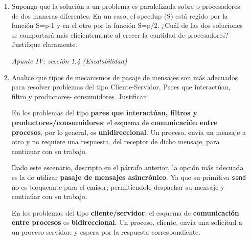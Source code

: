 \documentclass[a4paper, 10pt]{article}
\newenvironment{QandA}{
    \begin{enumerate}\bfseries}
    {\end{enumerate}
}
\newenvironment{answered}{\par\normalfont}{}
\begin{document}
\begin{QandA}
\begin{lstlisting}[multicols=2]
int request[n] = ([n] 0),
    grant[n] = ([n] 0);

Process Worker[i = 1..n]
    
# Seccion no critica ...

request[i] = 1;
while(grant[i] == 0) skip;
# Seccion Critica
grant[i] = 0;
# Seccion no critica ...
end;

Process Coordinator
while (true)
    for (j = 1; j < n; j++)
        if (request[j] == 1)
            request[j] = 0;
            grant[j] = 1;
            while (grant[j] == 1) skip;
        end;
    end;
end;
end;
\end{lstlisting}


\item Suponga que la solución a un problema es paralelizada sobre p procesadores de dos maneras diferentes.
En un caso, el speedup (S) está regido por la función S=p-1 y en el otro por la función S=p/2. ¿Cuál de las
dos soluciones se comportará más eficientemente al crecer la cantidad de procesadores? Justifique
claramente.
\begin{answered}
    \emph{Apunte IV: sección 1.4 (Escalabilidad)}
\end{answered}


\item Analice que tipos de mecanismos de pasaje de mensajes son más adecuados para resolver problemas del tipo Cliente-Servidor, Pares que interactúan, filtro y productores- consumidores. Justificar.

\begin{answered}
En los problemas del tipo \textbf{pares que interactúan, filtros y productores/consumidores}; el esquema de \textbf{comunicación entre procesos}, por lo general, es \textbf{unidireccional}. Un proceso, envía un mensaje a otro y no requiere una respuesta, del receptor de dicho mensaje, para continuar con su trabajo.

Dado este escenario, descripto en el párrafo anterior, la opción más adecuada es la de utilizar \textbf{pasaje de mensajes asincrónico}. Ya que su primitiva \lstinline{send} no es bloqueante para el emisor; permitiendole despachar su mensaje y continúar con su trabajo.

En los problemas del tipo \textbf{cliente/servidor}; el esquema de \textbf{comunicación entre procesos} es \textbf{bidireccional}. Un proceso, cliente, envía una solicitud a un proceso servidor; y espera por la respuesta correspondiente.


\end{answered}
\end{QandA}
\end{document}
